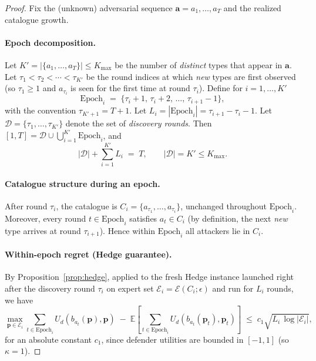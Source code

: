 \documentclass[11pt]{article}
\newcommand{\pvec}{\mathbf{p}}
\newcommand{\avec}{\mathbf{a}}
\newcommand{\cE}{\mathcal{E}}
\newcommand{\cD}{\mathcal{D}}
\newcommand{\EE}{\mathbb{E}}
\newcommand{\Kmax}{K_{\max}}
\begin{document}
\begin{proof}
Fix the (unknown) adversarial sequence $\avec=a_1,\dots,a_T$ and the realized catalogue growth.

\paragraph{Epoch decomposition.} Let $K' = |\{a_1,\dots,a_T\}| \le \Kmax$ be the number of \emph{distinct} types that appear in $\avec$. Let $\tau_1 < \tau_2 < \cdots < \tau_{K'}$ be the round indices at which \emph{new} types are first observed (so $\tau_1 \ge 1$ and $a_{\tau_i}$ is seen for the first time at round $\tau_i$). Define for $i = 1,\dots,K'$
\[
\mathrm{Epoch}_i \;=\; \{\tau_i+1,\,\tau_i+2,\,\dots,\,\tau_{i+1}-1\},
\]
with the convention $\tau_{K'+1} = T+1$. Let $L_i = |\mathrm{Epoch}_i| = \tau_{i+1} - \tau_i - 1$. Let $\cD = \{\tau_1,\dots,\tau_{K'}\}$ denote the set of \emph{discovery rounds}. Then $[1,T] = \cD \cup \bigcup_{i=1}^{K'} \mathrm{Epoch}_i$, and
\[
|\cD| + \sum_{i=1}^{K'} L_i \;=\; T, \qquad |\cD| = K' \le \Kmax.
\]

\paragraph{Catalogue structure during an epoch.} After round $\tau_i$, the catalogue is $C_i = \{a_{\tau_1},\dots,a_{\tau_i}\}$, unchanged throughout $\mathrm{Epoch}_i$. Moreover, every round $t \in \mathrm{Epoch}_i$ satisfies $a_t \in C_i$ (by definition, the next \emph{new} type arrives at round $\tau_{i+1}$). Hence within $\mathrm{Epoch}_i$ all attackers lie in $C_i$.

\paragraph{Within-epoch regret (Hedge guarantee).} By Proposition~\ref{prop:hedge}, applied to the fresh Hedge instance launched right after the discovery round $\tau_i$ on expert set $\cE_i = \cE(C_i; \epsilon)$ and run for $L_i$ rounds, we have
\begin{equation}\label{eq:hedge}
\max_{\pvec \in \cE_i} \sum_{t \in \mathrm{Epoch}_i} U_d(b_{a_t}(\pvec), \pvec) \;-\;\EE\!\left[\sum_{t \in \mathrm{Epoch}_i} U_d(b_{a_t}(\pvec_t), \pvec_t)\right] \;\le\; c_1 \sqrt{L_i \, \log|\cE_i|},
\end{equation}
for an absolute constant $c_1$, since defender utilities are bounded in $[-1,1]$ (so $\kappa=1$).


\end{proof}
\end{document}
